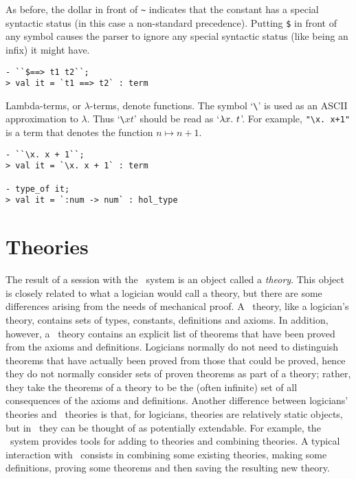     As before, the dollar in front of {\small\verb|~|} indicates that
    the constant has a special syntactic status (in this case a
    non-standard precedence). Putting {\small\verb|$|} in front of any
    symbol causes the parser to ignore any special syntactic status
    (like being an infix) it might have.

\begin{session}\begin{verbatim}
- ``$==> t1 t2``;
> val it = `t1 ==> t2` : term
\end{verbatim}\end{session}

Lambda-terms, or $\lambda$-terms, denote functions. The
symbol `{\small\verb|\|}'
is used as an {\small ASCII} approximation to $\lambda$.
Thus `{\small\verb|\|}$x$$t$' should be read
as `$\lambda x.\ t$'. For example,
{\small\verb|"\x. x+1"|} is a term that denotes the function
$n\mapsto n{+}1$.

\begin{session}\begin{verbatim}
- ``\x. x + 1``;
> val it = `\x. x + 1` : term

- type_of it;
> val it = `:num -> num` : hol_type
\end{verbatim}\end{session}

\section{Theories}
\label{theories}

The result of a session with the \HOL\ system is an object called a
{\it theory\/}.  This object is closely related to what a logician
would call a theory, but there are some differences arising from the
needs of mechanical proof.  A \HOL\ theory, like a logician's theory,
contains sets of types, constants, definitions and axioms.  In
addition, however, a \HOL\ theory contains an explicit list of
theorems that have been proved from the axioms and definitions.
Logicians normally do not need to distinguish theorems that have
actually been proved from those that could be proved, hence they do
not normally consider sets of proven theorems as part of a theory;
rather, they take the theorems of a theory to be the (often infinite)
set of all consequences of the axioms and definitions.  Another
difference between logicians' theories and \HOL\ theories is that, for
logicians, theories are relatively static objects, but in \HOL\ they
can be thought of as potentially extendable. For example, the \HOL\
system provides tools for adding to theories and combining theories.
A typical interaction with \HOL\ consists in combining some existing
theories, making some definitions, proving some theorems and then
saving the resulting new theory.

